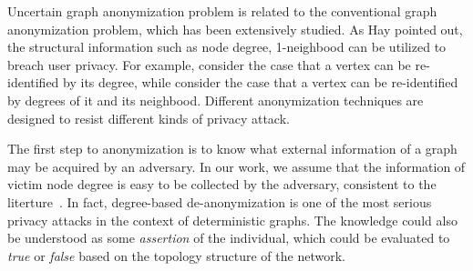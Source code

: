 Uncertain graph anonymization problem is related to the conventional graph anonymization problem, which has been extensively studied. As Hay {\etal} pointed out, the structural information such as node degree, 1-neighbood can be utilized to breach user privacy. For example, \cite{Boldi_Injecting_2012,Liu_Towards_2008,Thompson_The_2009} consider the case that a vertex can be re-identified by its degree, while \cite{Cormode_Anonymizing_2008,Wu_k_2010} consider the case that a vertex can be re-identified by degrees of it and its neighbood. Different anonymization techniques are designed to resist different kinds of privacy attack.

The first step to anonymization is to know what external information of a graph may be acquired by an adversary. In our work, we assume that the information of victim node degree is easy to be collected by the adversary, consistent to the literture~\cite{Liu_Towards_2008,Thompson_The_2009,Boldi_Injecting_2012,Wu_k_2010,Cormode_Anonymizing_2008}.  In fact, degree-based de-anonymization is one of the most serious privacy attacks in the context of deterministic graphs. The knowledge  could also be understood as some \emph{assertion} of the individual, which could be evaluated to \emph{true} or \emph{false} based on the topology structure of the network. 

